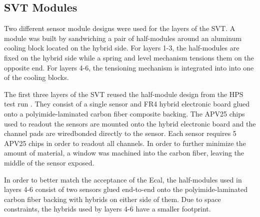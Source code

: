 
\subsection{SVT Modules}

Two different sensor module designs were used for the layers of the SVT.
A module was built by sandwiching a pair of half-modules around an aluminum 
cooling block located on the hybrid side. For layers 1-3, the half-modules are 
fixed on the hybrid side while a spring and level mechanism tensions them on
the opposite end.  For layers 4-6, the tensioning mechanism is integrated into
into one of the cooling blocks.

The first three layers of the SVT reused the half-module design from the HPS 
test run \cite{}. They consist of a single sensor
and FR4 hybrid electronic board glued onto a polyimide-laminated carbon fiber
composite backing.  The APV25 chips used to readout the sensors are mounted 
onto the hybrid electronic board and the channel pads are wiredbonded directly
to the sensor. Each sensor requires 5 APV25 chips in order to readout all channels.
In order to further minimize the amount of material, a window 
was machined into the carbon fiber, leaving the middle of the sensor exposed.

In order to better match the acceptance of the Ecal, 
the half-modules used in layers 4-6 consist of two sensors glued end-to-end onto
the polyimide-laminated carbon fiber backing with hybrids on either side of them.
Due to space constraints, the hybrids used by layers 4-6 have a smaller footprint.


